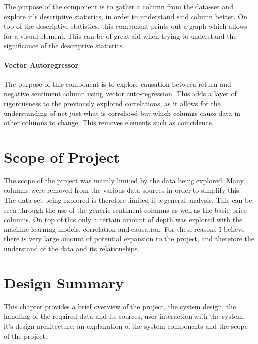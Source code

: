 The purpose of the component is to gather a column from the data-set and explore it's descriptive statistics, in order to understand said column better. On top of the descriptive statistics, this component prints out a graph which allows for a visual element. This can be of great aid when trying to understand the significance of the descriptive statistics.

\paragraph{Vector Autoregressor}

The purpose of this component is to explore causation between return and negative sentiment column using vector auto-regression. This adds a layer of rigorousness to the previously explored correlations, as it allows for the understanding of not just what is correlated but which columns cause data in other columns to change. This removes elements such as coincidence.

\section{Scope of Project}

The scope of the project was mainly limited by the data being explored. Many columns were removed from the various data-sources in order to simplify this. The data-set being explored is therefore limited it a general analysis. This can be seen through the use of the generic sentiment columns as well as the basic price columns. On top of this only a certain amount of depth was explored with the machine learning models, correlation and causation. For these reasons I believe there is very large amount of potential expansion to the project, and therefore the understand of the data and its relationships.

\section{Design Summary}

This chapter provides a brief overview of the project, the system design, the handling of the required data and its sources, user interaction with the system, it's design architecture, an explanation of the system components and the scope of the project.